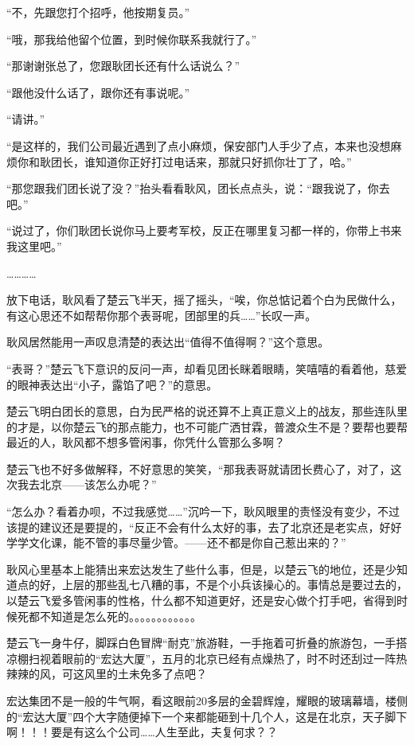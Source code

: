 “不，先跟您打个招呼，他按期复员。”

“哦，那我给他留个位置，到时候你联系我就行了。”

“那谢谢张总了，您跟耿团长还有什么话说么？”

“跟他没什么话了，跟你还有事说呢。”

“请讲。”

“是这样的，我们公司最近遇到了点小麻烦，保安部门人手少了点，本来也没想麻烦你和耿团长，谁知道你正好打过电话来，那就只好抓你壮丁了，哈。”

“那您跟我们团长说了没？”抬头看看耿风，团长点点头，说：“跟我说了，你去吧。”

“说过了，你们耿团长说你马上要考军校，反正在哪里复习都一样的，你带上书来我这里吧。”

…………

放下电话，耿风看了楚云飞半天，摇了摇头，“唉，你总惦记着个白为民做什么，有这心思还不如帮帮你那个表哥呢，团部里的兵……”长叹一声。

耿风居然能用一声叹息清楚的表达出“值得不值得啊？”这个意思。

“表哥？”楚云飞下意识的反问一声，却看见团长眯着眼睛，笑嘻嘻的看着他，慈爱的眼神表达出“小子，露馅了吧？”的意思。

楚云飞明白团长的意思，白为民严格的说还算不上真正意义上的战友，那些连队里的才是，以你楚云飞的那点能力，也不可能广洒甘霖，普渡众生不是？要帮也要帮最近的人，耿风都不想多管闲事，你凭什么管那么多啊？

楚云飞也不好多做解释，不好意思的笑笑，“那我表哥就请团长费心了，对了，这次我去北京——该怎么办呢？”

“怎么办？看着办呗，不过我感觉……”沉吟一下，耿风眼里的责怪没有变少，不过该提的建议还是要提的，“反正不会有什么太好的事，去了北京还是老实点，好好学学文化课，能不管的事尽量少管。——还不都是你自己惹出来的？”

耿风心里基本上能猜出来宏达发生了些什么事，但是，以楚云飞的地位，还是少知道点的好，上层的那些乱七八糟的事，不是个小兵该操心的。事情总是要过去的，以楚云飞爱多管闲事的性格，什么都不知道更好，还是安心做个打手吧，省得到时候死都不知道是怎么死的。。。。。。。。。。。。

楚云飞一身牛仔，脚踩白色冒牌“耐克”旅游鞋，一手拖着可折叠的旅游包，一手搭凉棚扫视着眼前的“宏达大厦”，五月的北京已经有点燥热了，时不时还刮过一阵热辣辣的风，可这风里的土未免多了点吧？

宏达集团不是一般的牛气啊，看这眼前20多层的金碧辉煌，耀眼的玻璃幕墙，楼侧的“宏达大厦”四个大字随便掉下一个来都能砸到十几个人，这是在北京，天子脚下啊！！！要是有这么个公司……人生至此，夫复何求？？

